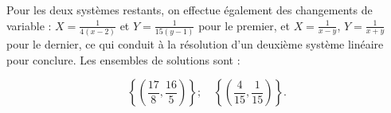 {{Pour les deux systèmes restants, on effectue également des changements de variable : $X=\frac{1}{4(x-2)}$ et $Y=\frac{1}{15(y-1)}$ pour le premier, et $X=\frac{1}{x-y}$, $Y=\frac{1}{x+y}$ pour le dernier, ce qui conduit à la résolution d'un deuxième système linéaire pour conclure. Les ensembles de solutions sont :

\[ 
\left\{ \left(\frac{17}{8},\frac{16}{5}\right)\right\}; \quad 
\left\{ \left(\frac{4}{15},\frac{1}{15}\right)\right\}.
\]
}
}
